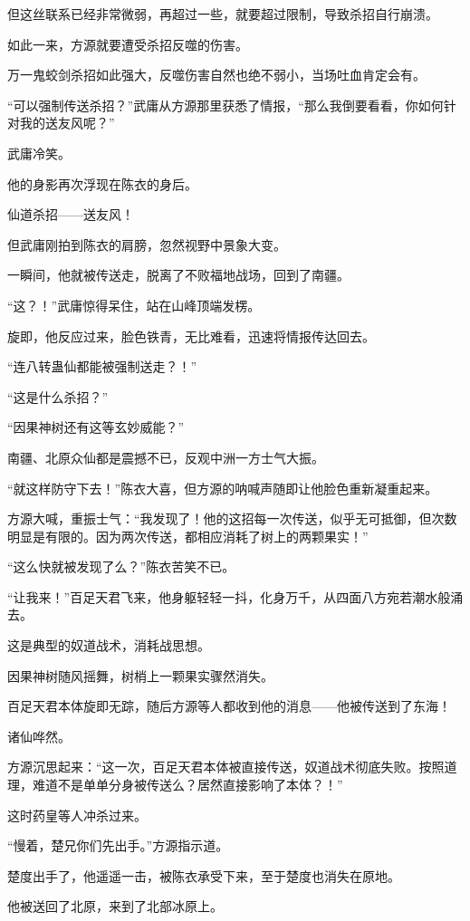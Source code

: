 \begin{this_body}
但这丝联系已经非常微弱，再超过一些，就要超过限制，导致杀招自行崩溃。

如此一来，方源就要遭受杀招反噬的伤害。

万一鬼蛟剑杀招如此强大，反噬伤害自然也绝不弱小，当场吐血肯定会有。

“可以强制传送杀招？”武庸从方源那里获悉了情报，“那么我倒要看看，你如何针对我的送友风呢？”

武庸冷笑。

他的身影再次浮现在陈衣的身后。

仙道杀招——送友风！

但武庸刚拍到陈衣的肩膀，忽然视野中景象大变。

一瞬间，他就被传送走，脱离了不败福地战场，回到了南疆。

“这？！”武庸惊得呆住，站在山峰顶端发楞。

旋即，他反应过来，脸色铁青，无比难看，迅速将情报传达回去。

“连八转蛊仙都能被强制送走？！”

“这是什么杀招？”

“因果神树还有这等玄妙威能？”

南疆、北原众仙都是震撼不已，反观中洲一方士气大振。

“就这样防守下去！”陈衣大喜，但方源的呐喊声随即让他脸色重新凝重起来。

方源大喊，重振士气：“我发现了！他的这招每一次传送，似乎无可抵御，但次数明显是有限的。因为两次传送，都相应消耗了树上的两颗果实！”

“这么快就被发现了么？”陈衣苦笑不已。

“让我来！”百足天君飞来，他身躯轻轻一抖，化身万千，从四面八方宛若潮水般涌去。

这是典型的奴道战术，消耗战思想。

因果神树随风摇舞，树梢上一颗果实骤然消失。

百足天君本体旋即无踪，随后方源等人都收到他的消息——他被传送到了东海！

诸仙哗然。

方源沉思起来：“这一次，百足天君本体被直接传送，奴道战术彻底失败。按照道理，难道不是单单分身被传送么？居然直接影响了本体？！”

这时药皇等人冲杀过来。

“慢着，楚兄你们先出手。”方源指示道。

楚度出手了，他遥遥一击，被陈衣承受下来，至于楚度也消失在原地。

他被送回了北原，来到了北部冰原上。


\end{this_body}
